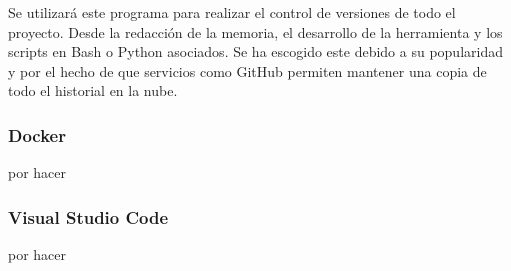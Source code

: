 Se utilizará este programa para realizar el control de versiones de todo el proyecto. Desde la redacción de la memoria, el desarrollo de la herramienta y los scripts en Bash o Python asociados. Se ha escogido este debido a su popularidad y por el hecho de que servicios como GitHub permiten mantener una copia de todo el historial en la nube.

\subsubsection{Docker}

por hacer

\subsubsection{Visual Studio Code}

por hacer
